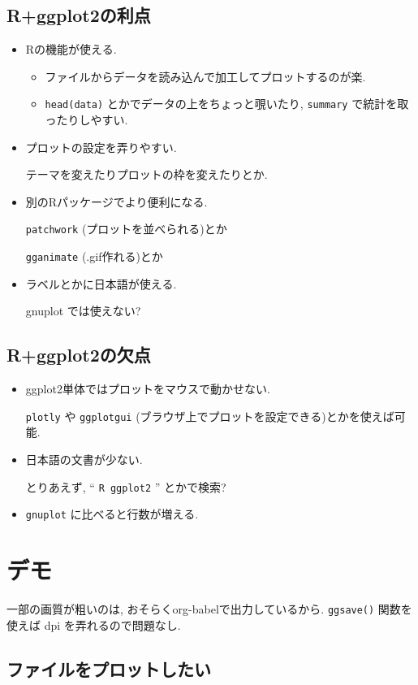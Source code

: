 \documentclass[lualatex,a4paper,12pt,report,ja=standard]{bxjsarticle}
\begin{document}
\subsection{R+ggplot2の利点}
\label{sec:orgce9d434}
\begin{itemize}
\item Rの機能が使える.
\begin{itemize}
\item ファイルからデータを読み込んで加工してプロットするのが楽.
\item \texttt{head(data)} とかでデータの上をちょっと覗いたり,
\texttt{summary} で統計を取ったりしやすい.
\end{itemize}
\item プロットの設定を弄りやすい.

テーマを変えたりプロットの枠を変えたりとか.
\item 別のRパッケージでより便利になる.

\texttt{patchwork} (プロットを並べられる)とか

\texttt{gganimate} (.gif作れる)とか
\item ラベルとかに日本語が使える.

gnuplot では使えない?
\end{itemize}
\subsection{R+ggplot2の欠点}
\label{sec:orgea87038}
\begin{itemize}
\item ggplot2単体ではプロットをマウスで動かせない.

\texttt{plotly} や  \texttt{ggplotgui} (ブラウザ上でプロットを設定できる)とかを使えば可能.
\item 日本語の文書が少ない.

とりあえず, `` \texttt{R ggplot2} '' とかで検索?
\item \texttt{gnuplot} に比べると行数が増える.
\end{itemize}
\section{デモ}
\label{sec:orge86f045}
一部の画質が粗いのは, おそらくorg-babelで出力しているから.
\texttt{ggsave()} 関数を使えば dpi を弄れるので問題なし.
\subsection{ファイルをプロットしたい}
\label{sec:org5ecf424}
\end{document}
